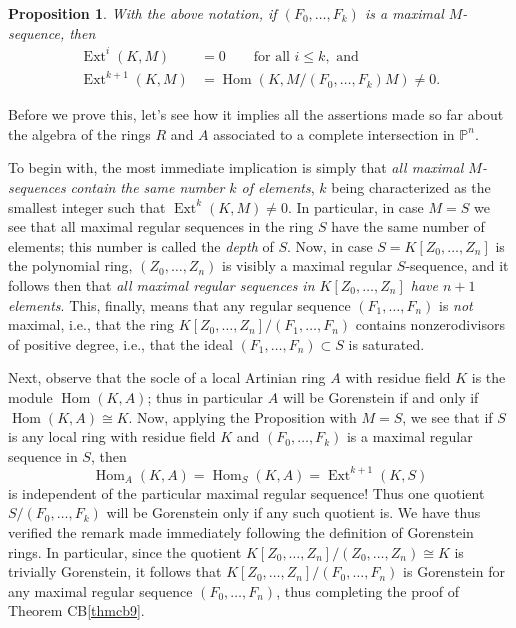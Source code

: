 \documentclass{bull-l}
\newcommand{\Ext}{\operatorname{Ext}}
\newcommand{\Hom}{\operatorname{Hom}}
\newtheorem{prop}{Proposition}
\theoremstyle{pplain}
\theoremstyle{definition}
\begin{document}
\begin{prop} \label{prop:nine}
With the above notation, if $(F_0,\dots,F_k)$ is a maximal $M$-sequence, then
\begin{align*}
\Ext^i(K,M)&=0 \qquad  \text{for all }i\le k, \text{ and}\\
\Ext^{k+1}(K,M)&=\Hom (K,M/(F_0,\dots,F_k)M)\ne 0.
\end{align*}
\end{prop}

Before we prove this, let's see how it implies all the assertions made so far
about the algebra of the rings $R$ and $A$ associated to a complete
intersection in $\mathbb{P}^n$.

To begin with, the most immediate implication is simply that \emph{all maximal
$M$-sequences contain the same number $k$ of elements}, $k$ being characterized
as the smallest integer such that $\Ext^k(K,M)\ne 0$.  In particular, in case
$M=S$ we see that all maximal regular sequences in the ring $S$ have the same
number of elements; this number is called the \emph{depth} of $S$. Now, in 
case $S=K[Z_0,\dots,Z_n]$ is the polynomial ring, $(Z_0,\dots,Z_n)$ is visibly
a maximal regular $S$-sequence, and it follows then that \emph{all maximal
regular sequences in $K[Z_0,\dots,Z_n]$ have $n+1$ elements}.  This, finally,
means that any regular sequence $(F_1,\dots,F_n)$ is \emph{not} maximal, i.e.,
that the ring $K[Z_0,\dots,Z_n]/(F_1,\dots,F_n)$ contains nonzerodivisors of
positive degree, i.e., that the ideal $(F_1,\dots,F_n)\subset S$ is saturated.

Next, observe that the socle of a local Artinian ring $A$ with residue field
$K$ is the module $\Hom(K,A)$; thus in particular $A$ will be Gorenstein if and
only if $\Hom(K,A)\cong K$.  Now, applying the Proposition with $M=S$, we see
that if $S$ is any local ring with residue field $K$ and $(F_0,\dots,F_k)$ is a
maximal regular sequence in $S$, then
\[\Hom_A(K,A)=\Hom_S(K,A)=\Ext^{k+1}(K,S)\]
is independent of the particular maximal regular sequence!  Thus one quotient
$S/(F_0,\dots,F_k)$ will be Gorenstein only if any such quotient is.  We have
thus verified the remark made immediately following the definition of
Gorenstein rings.  In particular, since the quotient
$K[Z_0,\dots,Z_n]/(Z_0,\dots,Z_n)\cong K$ is trivially Gorenstein, it follows
that $K[Z_0,\dots,Z_n]/(F_0,\dots,F_n)$ is  Gorenstein for any maximal regular 
sequence $(F_0,\dots,F_n)$, thus completing the proof of Theorem CB\ref{thmcb9}.
\end{document}
